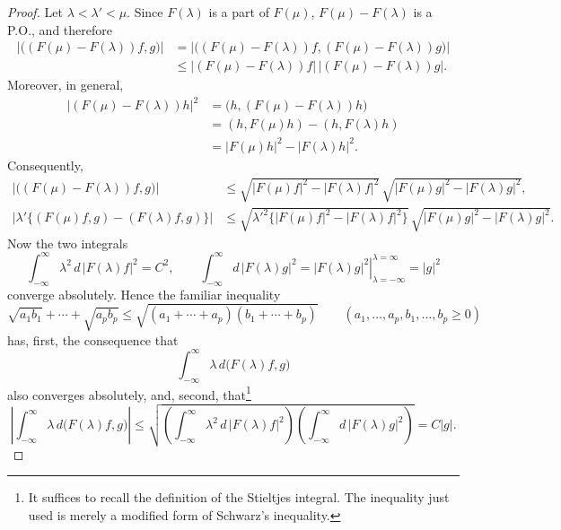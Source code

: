 ﻿\documentclass[paper=b5,fontsize=13pt,bookmarkpackage=false,twoside]{scrartcl}
\newcounter{translatornote}
\begin{document}
\begin{proof}
Let $\lambda<\lambda'<\mu$. Since $F(\lambda)$ is a part of $F(\mu)$, $F(\mu)-F(\lambda)$ is a P.O., and therefore
\begin{align*}
\bigl|\bigl((F(\mu)-F(\lambda))f,g\bigr)\bigr|
&=\bigl|\bigl((F(\mu)-F(\lambda))f,(F(\mu)-F(\lambda))g\bigr)\bigr|\\
&\le
\bigl|(F(\mu)-F(\lambda))f\bigr|\,
\bigl|(F(\mu)-F(\lambda))g\bigr|.
\end{align*}
Moreover, in general,
\begin{align*}
\bigl|(F(\mu)-F(\lambda))h\bigr|^2
&=\bigl(h,(F(\mu)-F(\lambda))h\bigr)\\
&=(h,F(\mu)h)-(h,F(\lambda)h)\\
&=|F(\mu)h|^2-|F(\lambda)h|^2.
\end{align*}
Consequently,
\begin{align*}
\bigl|\bigl((F(\mu)-F(\lambda))f,g\bigr)\bigr|
&\le
\sqrt{|F(\mu)f|^2-|F(\lambda)f|^2}\,
\sqrt{|F(\mu)g|^2-|F(\lambda)g|^2},\\
\left|\lambda'
\bigl\{(F(\mu)f,g)-(F(\lambda)f,g)\bigr\}\right|
&\le
\sqrt{\lambda'^2\bigl\{|F(\mu)f|^2-|F(\lambda)f|^2\bigr\}}\,
\sqrt{|F(\mu)g|^2-|F(\lambda)g|^2}.
\end{align*}
Now the two integrals
\[
\int_{-\infty}^{\infty}\lambda^2\,d\,|F(\lambda)f|^2=C^2,
\qquad
\int_{-\infty}^{\infty}d\,|F(\lambda)g|^2
=
\left.|F(\lambda)g|^2\right|_{\lambda=-\infty}^{\lambda=\infty}
=|g|^2
\]
converge absolutely. Hence the familiar inequality
\[
\sqrt{a_1b_1}+\cdots+\sqrt{a_pb_p}
\le
\sqrt{(a_1+\cdots+a_p)(b_1+\cdots+b_p)}
\qquad
(a_1,\ldots,a_p,b_1,\ldots,b_p\ge0)
\]
has, first, the consequence that
\[
\int_{-\infty}^{\infty}\lambda\,d\bigl(F(\lambda)f,g\bigr)
\]
also converges absolutely, and, second, that\footnote{\label{fn:51}It suffices to recall the definition of the Stieltjes integral. The inequality just used is merely a modified form of Schwarz's inequality.}
\[
\left|
\int_{-\infty}^{\infty}\lambda\,d\bigl(F(\lambda)f,g\bigr)
\right|
\le
\sqrt{
\left(\int_{-\infty}^{\infty}\lambda^2\,d\,|F(\lambda)f|^2\right)
\left(\int_{-\infty}^{\infty}d\,|F(\lambda)g|^2\right)}
=C|g|.
\]


\end{proof}
\end{document}
